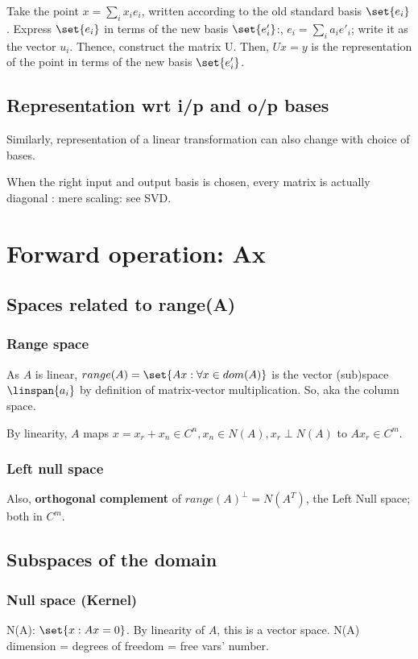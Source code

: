 \documentclass[oneside, article]{memoir}
\begin{document}
Take the point $x = \sum_i x_i e_i$, written according to the old standard basis $\set{e_i}$. Express $\set{e_i}$ in terms of the new basis $\set{e'_i}$:, $e_i = \sum_i a_i e'_i$; write it as the vector $u_i$. Thence, construct the matrix U. Then, $Ux = y$ is the representation of the point in terms of the new basis $\set{e'_i}$.

\subsection{Representation wrt i/p and o/p bases}
Similarly, representation of a linear transformation can also change with choice of bases.

When the right input and output basis is chosen, every matrix is actually diagonal : mere scaling: see SVD.

\section{Forward operation: Ax}
\subsection{Spaces related to range(A)}
\subsubsection{Range space}
As $A$ is linear, $range(A) = \set{Ax : \forall x \in dom(A)}$ is the vector (sub)space $\linspan{a_i}$ by definition of matrix-vector multiplication. So, aka the column space.

By linearity, $A$ maps $x = x_{r}+x_{n} \in C^{n}, x_n \in N(A), x_r \perp N(A) $ to $Ax_r \in C^{m}$.

\subsubsection{Left null space}
Also, \textbf{orthogonal complement} of $range(A)^\perp =N(A^{T})$, the Left Null space; both in $C^{m}$.

\subsection{Subspaces of the domain}
\subsubsection{Null space (Kernel)}
N(A): $\set{x: Ax = 0}$. By linearity of $A$, this is a vector space. N(A) dimension = degrees of freedom = free vars' number.
\end{document}
